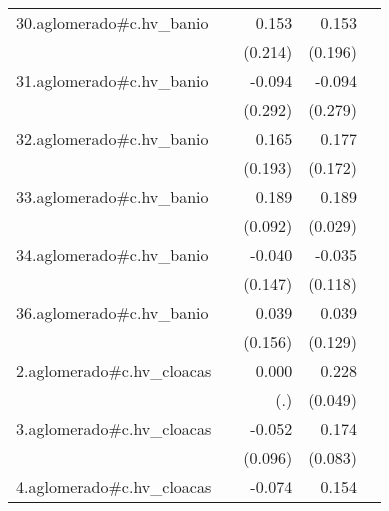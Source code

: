 {\begin{longtable}{l*{4}{D{.}{.}{-1}}}
\addlinespace
30.aglomerado#c.hv\_banio&                     &       0.153         &       0.153         &                     \\
            &                     &     (0.214)         &     (0.196)         &                     \\
\addlinespace
31.aglomerado#c.hv\_banio&                     &      -0.094         &      -0.094         &                     \\
            &                     &     (0.292)         &     (0.279)         &                     \\
\addlinespace
32.aglomerado#c.hv\_banio&                     &       0.165         &       0.177         &                     \\
            &                     &     (0.193)         &     (0.172)         &                     \\
\addlinespace
33.aglomerado#c.hv\_banio&                     &       0.189\sym{*}  &       0.189\sym{***}&                     \\
            &                     &     (0.092)         &     (0.029)         &                     \\
\addlinespace
34.aglomerado#c.hv\_banio&                     &      -0.040         &      -0.035         &                     \\
            &                     &     (0.147)         &     (0.118)         &                     \\
\addlinespace
36.aglomerado#c.hv\_banio&                     &       0.039         &       0.039         &                     \\
            &                     &     (0.156)         &     (0.129)         &                     \\
\addlinespace
2.aglomerado#c.hv\_cloacas&                     &       0.000         &       0.228\sym{***}&                     \\
            &                     &         (.)         &     (0.049)         &                     \\
\addlinespace
3.aglomerado#c.hv\_cloacas&                     &      -0.052         &       0.174\sym{*}  &                     \\
            &                     &     (0.096)         &     (0.083)         &                     \\
\addlinespace
4.aglomerado#c.hv\_cloacas&                     &      -0.074         &       0.154\sym{***}&                     \\

\end{longtable}}
